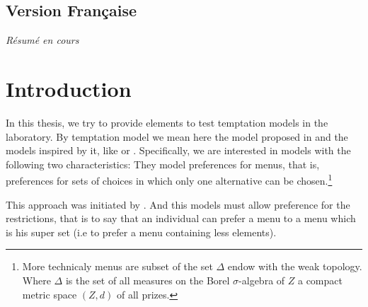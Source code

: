 \documentclass[
]{book}
\begin{document}
\hypertarget{version-franuxe7aise}{%
\section*{Version Française}\label{version-franuxe7aise}}

\emph{Résumé en cours}

\hypertarget{intro1}{%
\chapter{Introduction}\label{intro1}}

In this thesis, we try to provide elements to test temptation models in the
laboratory.
By temptation model we mean here the model proposed in \citet{gul2001temptation} and
the models inspired by it, like \citet{noor2010uphill} or \citet{noor2015menu}.
Specifically, we are interested in models with the following two characteristics:
They model preferences for menus, that is, preferences for sets of choices in
which only one alternative can be chosen.\footnote{More technicaly menus are subset of the set \(\Delta\) endow with the weak
  topology.
  Where \(\Delta\) is the set of all measures on the Borel \(\sigma\)-algebra of \(Z\) a
  compact metric space \((Z,d)\) of all prizes.}

This approach was initiated by \citet{kreps1979representation}.
And this models must allow preference for the restrictions, that is to say that
an individual can prefer a menu to a menu which is his super set
(i.e to prefer a menu containing less elements).
\end{document}
